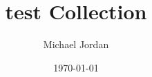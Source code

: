 \documentclass{report}
\title{test Collection}
\author{Michael Jordan}
\date{\today}
\begin{document}
\newpage

\maketitle

\newpage

\renewcommand{\contentsname}{Table of Content}
\tableofcontents











\end{document}
